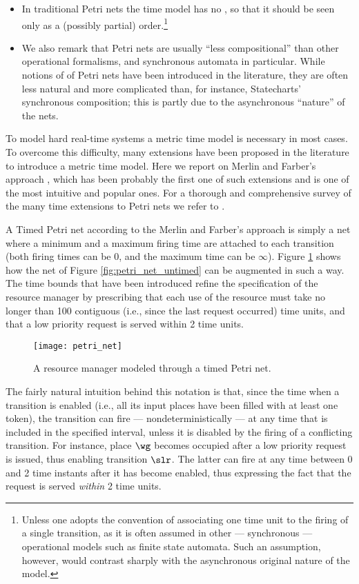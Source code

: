 \begin{itemize}
\item In traditional Petri nets the time model has no , so that 
it should be seen only as a (possibly partial) order.\footnote{Unless one adopts the convention of associating one time unit to the firing of a single transition, as it is often assumed in other --- synchronous --- operational models such as finite state automata. Such an assumption, however, would contrast sharply with the asynchronous original nature of the model.}

\item We also remark that Petri nets are usually ``less compositional'' 
than other operational formalisms, and synchronous automata in 
particular. While notions of  of Petri nets have been 
introduced in the literature, they are often less natural and 
more complicated than, for instance, Statecharts' synchronous 
composition; this is partly due to the asynchronous ``nature'' 
of the nets. 
\end{itemize}

To model hard real-time systems a metric time model is necessary in
most cases. To overcome this difficulty, many extensions have been
proposed in the literature to introduce a metric time model. Here we
report on Merlin and Farber's approach \cite{MF76}, which has been
probably the first one of such extensions and is one of the most
intuitive and popular ones.  For a thorough and comprehensive survey
of the many time extensions to Petri nets we refer to
\cite{CM99,Cer93}.

A Timed Petri net according to the Merlin and Farber's approach is
simply a net where a minimum and a maximum firing time are attached to
each transition (both firing times can be 0, and the maximum time can
be $\infty$). Figure \ref{fig:petri_net} shows how the net of Figure
\ref{fig:petri_net_untimed} can be augmented in such a way. The time
bounds that have been introduced refine the specification of the
resource manager by prescribing that each use of the resource must
take no longer than 100 contiguous (i.e., since the last request
occurred) time units, and that a low priority request is served within
2 time units.
\begin{figure}[htb!]
	 \centering
	 \texttt{[image: petri\_net]}
	 \caption{A resource manager modeled through a timed Petri net.}
	 \label{fig:petri_net}
\end{figure}

The fairly natural intuition behind this notation is that, since the
time when a transition is enabled (i.e., all its input places have
been filled with at least one token), the transition can fire ---
nondeterministically --- at any time that is included in the specified
interval, unless it is disabled by the firing of a conflicting
transition. For instance, place $\wg$ becomes occupied after a low
priority request is issued, thus enabling transition $\slr$. The
latter can fire at any time between 0 and 2 time instants after it has
become enabled, thus expressing the fact that the request is served
\emph{within} 2 time units.

